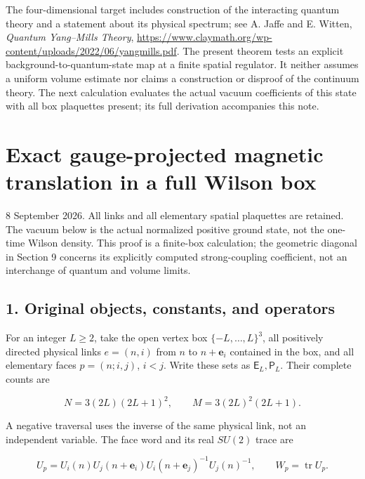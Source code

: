 \documentclass[
  11pt,
]{article}
\begin{document}
The four-dimensional target includes construction of the interacting
quantum theory and a statement about its physical spectrum; see A. Jaffe
and E. Witten, \emph{Quantum Yang--Mills Theory},
\url{https://www.claymath.org/wp-content/uploads/2022/06/yangmills.pdf}.
The present theorem tests an explicit background-to-quantum-state map at
a finite spatial regulator. It neither assumes a uniform volume estimate
nor claims a construction or disproof of the continuum theory. The next
calculation evaluates the actual vacuum coefficients of this state with
all box plaquettes present; its full derivation accompanies this note.

\clearpage
\section{Exact gauge-projected magnetic translation in a full Wilson
box}\label{magnetic-part-2-exact-gauge-projected-magnetic-translation-in-a-full-wilson-box}

8 September 2026. All links and all elementary spatial plaquettes are
retained. The vacuum below is the actual normalized positive ground
state, not the one-time Wilson density. This proof is a finite-box
calculation; the geometric diagonal in Section 9 concerns its explicitly
computed strong-coupling coefficient, not an interchange of quantum and
volume limits.

\subsection{1. Original objects, constants, and
operators}\label{magnetic-part-2-original-objects-constants-and-operators}

For an integer \(L\ge2\), take the open vertex box
\(\{-L,\ldots,L\}^3\), all positively directed physical links
\(e=(n,i)\) from \(n\) to \(n+\mathbf e_i\) contained in the box, and
all elementary faces \(p=(n;i,j)\), \(i<j\). Write these sets as
\(\mathsf E_L,\mathsf P_L\). Their complete counts are

\[
N=3(2L)(2L+1)^2,\qquad M=3(2L)^2(2L+1).
\tag{1.1}
\]

A negative traversal uses the inverse of the same physical link, not an
independent variable. The face word and its real \(SU(2)\) trace are

\[
U_p=U_i(n)U_j(n+\mathbf e_i)U_i(n+\mathbf e_j)^{-1}U_j(n)^{-1},
\qquad W_p=\operatorname{tr}U_p.
\tag{1.2}
\]
\end{document}
